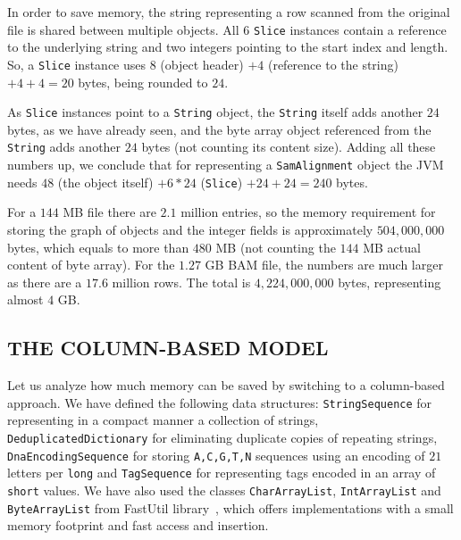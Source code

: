 \documentclass[a4paper,twoside]{article}
\begin{document}
In order to save memory, the string representing a row scanned from the original file is shared between multiple objects.
All $6$ {\texttt{Slice}} instances contain a reference to the  underlying string and two integers pointing to the start index and length.
So, a {\texttt{Slice}} instance uses $8$ (object header) $+4$ (reference to the string) $ + 4 + 4 = 20$ bytes, being rounded to $24$.

As {\texttt{Slice}} instances point to a {\texttt{String}} object, the {\texttt{String}} itself adds another $24$ bytes, as we have already seen, and the byte array object referenced from the {\texttt{String}} adds another $24$ bytes (not counting its content size).
Adding all these numbers up, we conclude that for representing a {\texttt{SamAlignment}} object the JVM needs $48$ (the object itself) $ + 6*24$ (\texttt{Slice}) $ + 24 + 24 = 240$ bytes.

For a $144$ MB file there are $2.1$ million entries, so the memory requirement for storing the graph of objects and the integer fields is approximately $504,000,000$ bytes, which equals to more than $480$ MB (not counting the $144$ MB actual content of byte array).
For the $1.27$ GB BAM file, the numbers are much larger as there are a $17.6$ million rows.
The total is $4,224,000,000$ bytes, representing almost $4$ GB\@.



\subsection{\uppercase{The Column-Based Model}} 
\label{subsec:column}

Let us analyze how much memory can be saved by switching to a column-based approach.
We have defined the following data structures: {\texttt{StringSequence}} for representing in a compact manner a collection of strings, {\texttt{DeduplicatedDictionary}} for eliminating duplicate copies of repeating strings, {\texttt{DnaEncodingSequence}} for storing {\texttt{A,C,G,T,N}} sequences using an encoding of $21$ letters per {\texttt{long}} and {\texttt{TagSequence}} for representing tags encoded in an array of {\texttt{short}} values.
We have also used the classes {\texttt{CharArrayList}}, {\texttt{IntArrayList}} and {\texttt{ByteArrayList}} from FastUtil library~\cite{fastutil}, which offers implementations with a small memory footprint and fast access and insertion.
\end{document}
